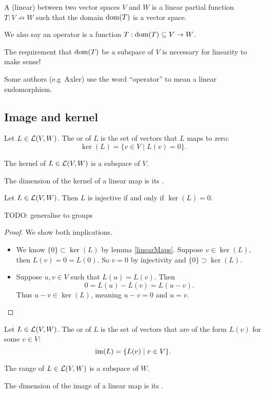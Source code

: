 \begin{definition}
A (linear)  between two vector spaces $V$ and $W$ is a linear partial function $T: V \not\to W$ such that the domain $\operatorname{dom}(T)$ is a vector space.

We also say an operator is a function $T: \operatorname{dom}(T)\subseteq V\to W$.
\end{definition}
The requirement that $\operatorname{dom}(T)$ be a subspace of $V$ is necessary for linearity to make sense!

Some authors (e.g\ Axler) use the word ``operator'' to mean a linear endomorphism.

\subsection{Image and kernel}
\begin{definition}
Let $L \in \operatorname{\mathcal{L}}(V,W)$. The  or  of $L$ is the set of vectors that $L$ maps to zero:
\[ \ker(L) = \{ v\in V \;|\; L(v) = 0 \}. \]
\end{definition}
\begin{proposition} \label{kernelSubspace}
The kernel of $L\in \operatorname{\mathcal{L}}(V,W)$ is a subspace of $V$.
\end{proposition}
\begin{definition}
The dimension of the kernel of a linear map is its .
\end{definition}
\begin{proposition} \label{injectivityKernelTriviality}
Let $L\in\operatorname{\mathcal{L}}(V,W)$. Then $L$ is injective if and only if $\ker(L) = 0$.
\end{proposition}
TODO: generalise to groups
\begin{proof}
We show both implications.
\begin{itemize}
\item[\boxed{\Rightarrow}] We know $\{0\}\subset \ker(L)$ by lemma \ref{linearMaps}. Suppose $v\in \ker(L)$, then $L(v) = 0 = L(0)$. So $v=0$ by injectivity and $\{0\}\supset \ker(L)$.
\item[\boxed{\Leftarrow}] Suppose $u,v \in V$ such that $L(u)=L(v)$. Then
\[ 0 = L(u) - L(v) = L(u-v). \]
Thus $u-v\in \ker(L)$, meaning $u-v = 0$ and $u=v$.
\end{itemize}
\end{proof}

\begin{definition}
Let $L \in \operatorname{\mathcal{L}}(V,W)$. The  or  of $L$ is the set of vectors that are of the form $L(v)$ for some $v\in V$:
\[ \operatorname{im}(L) = \{ L(v) \;|\; v\in V \}. \]
\end{definition}
\begin{proposition}
The range of $L\in \operatorname{\mathcal{L}}(V,W)$ is a subspace of $W$.
\end{proposition}
\begin{definition}
The dimension of the image of a linear map is its .
\end{definition}


